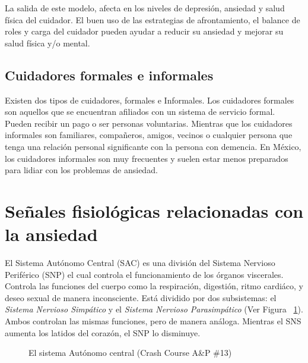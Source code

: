 	La salida de este modelo, afecta en los niveles de depresi\'on, ansiedad y salud f\'isica del cuidador. El buen uso de las estrategias de afrontamiento, el balance de roles y carga del cuidador pueden ayudar a reducir su ansiedad y mejorar su salud f\'isica y/o mental.

	\subsection{Cuidadores formales e informales}\label{secc:caregivers}
		Existen dos tipos de cuidadores, formales e Informales. Los cuidadores formales son aquellos que se encuentran afiliados con un sistema de servicio formal. Pueden recibir un pago o ser personas voluntarias. Mientras que los cuidadores informales son familiares, compa\~neros, amigos, vecinos o cualquier persona que tenga una relaci\'on personal significante con la persona con demencia. En M\'exico, los cuidadores informales son muy frecuentes y suelen estar menos preparados para lidiar con los problemas de ansiedad.

	\section{Se\~nales fisiol\'ogicas relacionadas con la ansiedad}\label{secc:signals}
	El Sistema Aut\'onomo Central (SAC) es una divisi\'on del Sistema Nervioso Perif\'erico (SNP) el cual controla el funcionamiento de los \'organos viscerales. Controla las funciones del cuerpo como la respiraci\'on, digesti\'on, ritmo cardi\'aco, y deseo sexual de manera inconsciente. Est\'a dividido por dos subsistemas: el \textit{Sistema Nervioso Simp\'atico} y el \textit{Sistema Nervioso Parasimp\'atico} (Ver Figura ~\ref{fig:modeloSNP}). Ambos controlan las mismas funciones, pero de manera an\'aloga. Mientras el SNS aumenta los latidos del coraz\'on, el SNP lo disminuye.

\begin{figure}[h]
	\centering
	\caption{El sistema Aut\'onomo central (Crash Course A\&P \#13) \label{fig:modeloSNP}}
\end{figure}

